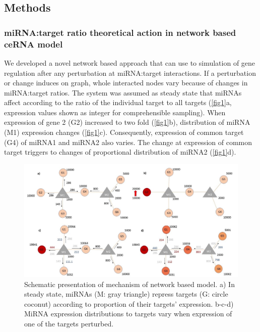 \documentclass[]{article}
\begin{document}
\hypertarget{methods}{%
\subsection{Methods}\label{methods}}

\hypertarget{mirnatarget-ratio-theoretical-action-in-network-based-cerna-model}{%
\subsubsection{miRNA:target ratio theoretical action in network based
ceRNA
model}\label{mirnatarget-ratio-theoretical-action-in-network-based-cerna-model}}

We developed a novel network based approach that can use to simulation
of gene regulation after any perturbation at miRNA:target interactions.
If a perturbation or change induces on graph, whole interacted nodes
vary because of changes in miRNA:target ratios. The system was assumed
as steady state that miRNAs affect according to the ratio of the
individual target to all targets (\autoref{fig1}a, expression values
shown as integer for comprehensible sampling). When expression of gene 2
(G2) increased to two fold (\autoref{fig1}b), distribution of miRNA (M1)
expression changes (\autoref{fig1}c). Consequently, expression of common
target (G4) of miRNA1 and miRNA2 also varies. The change at expression
of common target triggers to changes of proportional distribution of
miRNA2 (\autoref{fig1}d).

\begin{figure}
\hypertarget{fig1}{%
\centering
\includegraphics{Fig1.jpg}
\caption{Schematic presentation of mechanism of network based model. a)
In steady state, miRNAs (M: gray triangle) repress targets (G: circle
coconut) according to proportion of their targets' expression. b-c-d)
MiRNA expression distributions to targets vary when expression of one of
the targets perturbed.}\label{fig1}
}
\end{figure}
\end{document}
